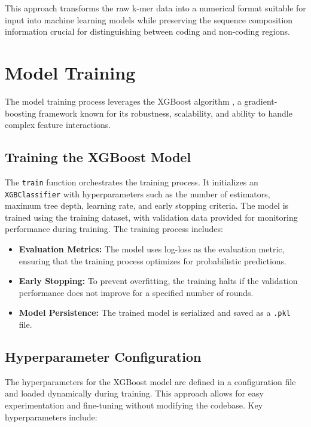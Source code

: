 \documentclass[
	a4paper, %
	10pt, %
	unnumberedsections, %
	twoside, %
]{LTJournalArticle}
\begin{document}
This approach transforms the raw k-mer data into a numerical format suitable for input into machine learning models while preserving the sequence composition information crucial for distinguishing between coding and non-coding regions.

\section{Model Training}

The model training process leverages the XGBoost algorithm \cite{Chen:2016}, a gradient-boosting framework known for its robustness, scalability, and ability to handle complex feature interactions.

\subsection{Training the XGBoost Model}

The \texttt{train} function orchestrates the training process. It initializes an \texttt{XGBClassifier} with hyperparameters such as the number of estimators, maximum tree depth, learning rate, and early stopping criteria. The model is trained using the training dataset, with validation data provided for monitoring performance during training. The training process includes:

\begin{itemize}
    \item \textbf{Evaluation Metrics:} The model uses log-loss as the evaluation metric, ensuring that the training process optimizes for probabilistic predictions.
    \item \textbf{Early Stopping:} To prevent overfitting, the training halts if the validation performance does not improve for a specified number of rounds.
    \item \textbf{Model Persistence:} The trained model is serialized and saved as a \texttt{.pkl} file.
\end{itemize}

\subsection{Hyperparameter Configuration}

The hyperparameters for the XGBoost model are defined in a configuration file and loaded dynamically during training. This approach allows for easy experimentation and fine-tuning without modifying the codebase. Key hyperparameters include:
\end{document}
